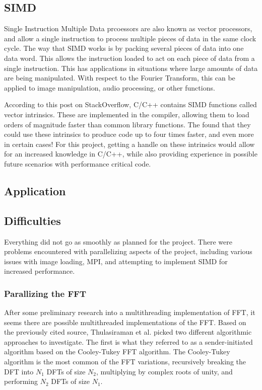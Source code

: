 \documentclass[12pt]{extarticle}
\begin{document}
\subsection*{SIMD}
    
    Single Instruction Multiple Data prcoessors are also known as vector processors, and allow a single instruction
    to process multiple pieces of data in the same clock cycle. The way that SIMD works is by packing several pieces of data
    into one data word. This allows the instruction loaded to act on each piece of data from a single instruction.
    This has applications in situations where large amounts of data are being manipulated. With respect to the Fourier Transform,
    this can be applied to image manipulation, audio processing, or other functions.

    According to this post\cite{Konstantin:2020} on StackOverflow, C/C++ contains SIMD functions called vector intrinsics.
    These are implemented in the compiler, allowing them to load orders of magnitude faster than common library functions. 
    The found that they could use these intrinsics to produce code up to four times faster, and even more in certain cases!
    For this project, getting a handle on these intrinsics would allow for an increased knowledge in C/C++, while also providing
    experience in possible future scenarios with performance critical code.

\subsection*{Application}

\subsection*{Difficulties}
	Everything did not go as smoothly as planned for the project. There were problems encountered with parallelizing aspects of the 
	project, including various issues with image loading, MPI, and attempting to implement SIMD for increased performance.

	\subsubsection*{Parallizing the FFT}
	After some preliminary research into a multithreading implementation of FFT\cite{Thulasiraman:2021}, it seems there are possible multithreaded implementations of the FFT. 
	Based on the previously cited source, Thulasiraman et al. picked two 
    different algorithmic approaches to investigate. 
    The first is what they referred to as a sender-initiated algorithm based on the Cooley-Tukey FFT algorithm. 
    The Cooley-Tukey algorithm is the most common of the FFT variations, recursively breaking the DFT into $N_1$ DFTs of size $N_2$, multiplying by complex roots of unity, and performing $N_2$ DFTs of size $N_1$.
    
\end{document}
